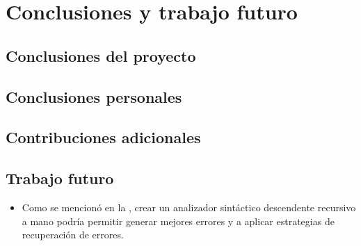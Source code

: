 \chapter{Conclusiones y trabajo futuro}\label{chap:conclusions}

\section{Conclusiones del proyecto}

\section{Conclusiones personales}

\section{Contribuciones adicionales}

\section{Trabajo futuro}
\begin{itemize}
    \item Como se mencionó en la , crear un analizador
    sintáctico descendente recursivo a mano podría permitir generar mejores
    errores y a aplicar estrategias de recuperación de errores.
\end{itemize}
